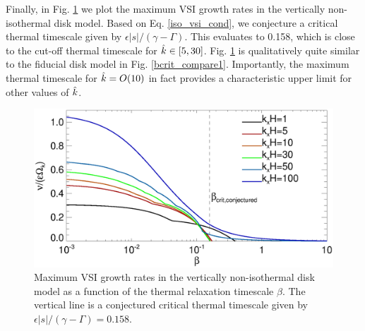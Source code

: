 Finally, in Fig. \ref{bcrit_compare2} we plot the maximum VSI growth
rates in the vertically non-isothermal disk model.  Based on 
Eq. \ref{iso_vsi_cond}, we conjecture a critical
thermal timescale given by $\epsilon|s|/(\gamma - \Gamma)$. This
evaluates to 0.158, which is close to the cut-off thermal timescale
for $\hat{k}\in[5,30]$. Fig. \ref{bcrit_compare2} is qualitatively quite
similar to the fiducial disk model in 
Fig. \ref{bcrit_compare1}. Importantly, the maximum thermal
timescale for $\hat{k}=O(10)$ in fact provides a 
characteristic upper limit for other values of $\hat{k}$.  

\begin{figure}
  \includegraphics[width=\linewidth]{figures/gcorr_compare_vnoniso_maxrate} 
  \caption{Maximum VSI growth rates in the vertically non-isothermal disk
    model as a function of the thermal relaxation timescale
    $\beta$. The vertical line is a conjectured 
    critical thermal timescale given by
    $\epsilon|s|/(\gamma-\Gamma)=0.158$.  
    \label{bcrit_compare2}}   
\end{figure} 




